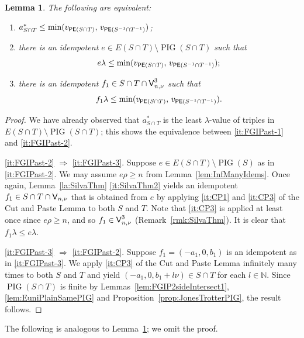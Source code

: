 \documentclass[reqno]{amsart}
\theoremstyle{plain}
\newtheorem{lem}{Lemma}[section]
\theoremstyle{definition}
\DeclareMathOperator{\PIG}{PIG}
\DeclareMathOperator{\PE}{\textup{\textsf{PE}}}
\DeclareMathOperator{\V}{\textup{\textsf{V}}}
\newenvironment{thmenumerate}{\begin{enumerate}[topsep=0mm, leftmargin=14mm,itemsep=1mm,label=\textup{(\roman*)}]
}{\end{enumerate}}
\numberwithin{equation}{section}
\begin{document}
\begin{lem}
\label{lem:FGIPast1}
The following are equivalent:
\begin{thmenumerate}
    \item \label{it:FGIPast-1} $a_{S\cap T}^\ast \leq \min(v_{\PE(S\cap T)},\, v_{\PE(S^{-1}\cap T^{-1})})$;
    \item \label{it:FGIPast-2} there is an idempotent $e\in E(S\cap T)\setminus\PIG(S\cap T)$ such that 
    \[
    e\lambda \leq \min(v_{\PE(S\cap T)},\, v_{\PE(S^{-1}\cap T^{-1})});
    \]
    \item \label{it:FGIPast-3} there is an idempotent $f_1\in S\cap T\cap \V_{n,\nu}^3$ such that 
    \[
    f_1\lambda \leq \min(v_{\PE(S\cap T)},\, v_{\PE(S^{-1}\cap T^{-1})}).
    \]
\end{thmenumerate}
\end{lem}
\begin{proof}
We have already observed that $a_{S\cap T}^\ast$ is the least $\lambda$-value of triples in $E(S\cap T)\setminus \PIG(S\cap T)$; this shows the equivalence between \ref{it:FGIPast-1} and \ref{it:FGIPast-2}.

\noindent \ref{it:FGIPast-2} $\Rightarrow$ \ref{it:FGIPast-3}. 
Suppose $e \in E(S\cap T)\setminus\PIG(S)$ as in \ref{it:FGIPast-2}.
We may assume $e\rho \geq n$ from Lemma~\ref{lem:InfManyIdems}.
Once again, Lemma~\ref{la:SilvaThm} \ref{it:SilvaThm2} yields an idempotent $f_1\in S\cap T\cap \V_{n,\nu}$ that is obtained from $e$ by applying \ref{it:CP1} and \ref{it:CP3} of the Cut and Paste Lemma to both $S$ and $T$. Note that \ref{it:CP3} is applied at least once since $e\rho \geq n$, and so $f_1\in \V_{n,\nu}^3$ (Remark~\ref{rmk:SilvaThm}). It is clear that $f_1\lambda \leq e\lambda$. 


\noindent \ref{it:FGIPast-3} $\Rightarrow$ \ref{it:FGIPast-2}. Suppose $f_1 = (-a_1, 0, b_1)$ is an idempotent as in
\ref{it:FGIPast-3}. We apply \ref{it:CP3} of the Cut and Paste Lemma infinitely many times to both $S$ and $T$ and yield $(-a_1, 0, b_1+l\nu)\in S\cap T$ for each $l\in\mathbb{N}$. Since $\PIG(S\cap T)$ is finite by Lemmas~\ref{lem:FGIP2sideIntersect1}, \ref{lem:EuniPlainSamePIG} and Proposition~\ref{prop:JonesTrotterPIG}, the result follows.
\end{proof}

The following is analogous to Lemma~\ref{lem:FGIPast1}; we omit the proof. 
\end{document}

